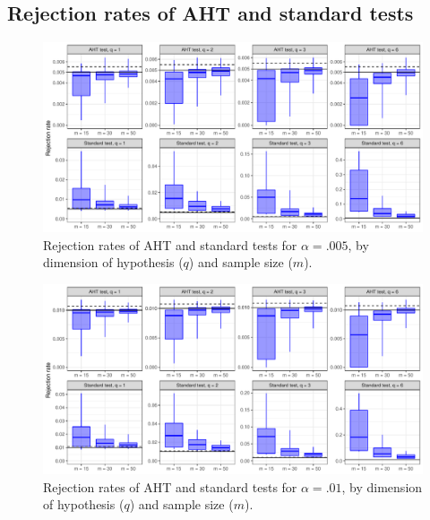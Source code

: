 \documentclass[12pt]{article}
\begin{document}
\begin{landscape}
\subsection{Rejection rates of AHT and standard tests}

\begin{figure}[H]

{\centering \includegraphics[width=\linewidth]{CR_fig/overview_005-1} 

}

\caption{Rejection rates of AHT and standard tests for $\alpha = .005$, by dimension of hypothesis ($q$) and sample size ($m$).}\label{fig:overview_005}
\end{figure}

\begin{figure}[H]

{\centering \includegraphics[width=\linewidth]{CR_fig/overview_01-1} 

}

\caption{Rejection rates of AHT and standard tests for $\alpha = .01$, by dimension of hypothesis ($q$) and sample size ($m$).}\label{fig:overview_01}
\end{figure}

\begin{figure}[H]


\end{figure}
\end{landscape}
\end{document}
